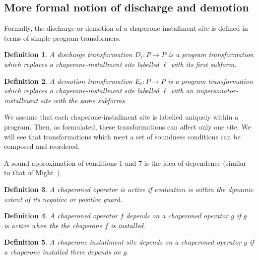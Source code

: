 \documentclass{sigplanconf}
\newtheorem{definition}{Definition}
\begin{document}


\subsection{More formal notion of discharge and demotion}

Formally, the discharge or demotion of a chaperone installment site is defined in terms of simple program transformers.

\begin{definition}
A \emph{discharge transformation} $D_\ell : P\rightarrow P$ is a program transformation which replaces a chaperone-installment site labelled $\ell$ with its first subform.
\end{definition}

\begin{definition}
A \emph{demotion transformation} $E_\ell : P\rightarrow P$ is a program transformation which replaces a chaperone-installment site labelled $\ell$ with an impersonator-installment site with the same subforms.
\end{definition}

We assume that each chaperone-installment site is labelled uniquely within a program.
Then, as formulated, these transformations can affect only one site.
We will see that transformations which meet a set of soundness conditions can be composed and reordered.

A sound approximation of conditions 1 and 7 is the idea of dependence (similar to that of Might~\cite{might2009dependence}).

\begin{definition}
A chaperoned operator is \emph{active} if evaluation is within the dynamic extent of its negative or positive guard.
\end{definition}

\begin{definition}
A chaperoned operator $f$ \emph{depends} on a chaperoned operator $g$ if $g$ is active when the the chaperone $f$ is installed.
\end{definition}

\begin{definition}
A chaperone installment site \emph{depends} on a chaperoned operator $g$ if a chaperone installed there depends on $g$.
\end{definition}
\end{document}
